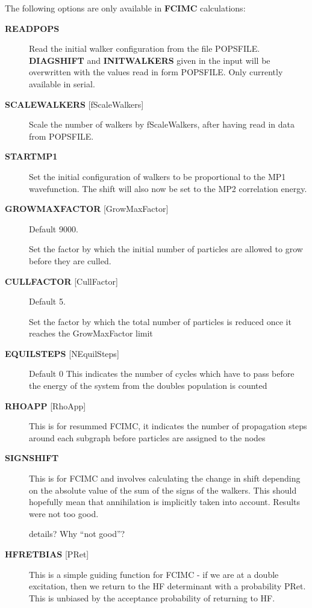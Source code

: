 \documentclass[openany,a4paper,10pt]{manual}
\begin{document}
The following options are only available in \textbf{FCIMC} calculations:
\begin{description}
\item[\textbf{READPOPS}]
Read the initial walker configuration from the file POPSFILE.
\textbf{DIAGSHIFT} and \textbf{INITWALKERS} given in the input will be
overwritten with the values read in form POPSFILE. Only currently available in serial.

\item[\textbf{SCALEWALKERS} {[}fScaleWalkers{]}]
Scale the number of walkers by fScaleWalkers, after having read in data from POPSFILE.

\item[\textbf{STARTMP1}]
Set the initial configuration of walkers to be proportional to the MP1 wavefunction. The shift will also
now be set to the MP2 correlation energy.

\item[\textbf{GROWMAXFACTOR} {[}GrowMaxFactor{]}]
Default 9000.

Set the factor by which the initial number of particles are allowed to grow before
they are culled.

\item[\textbf{CULLFACTOR} {[}CullFactor{]}]
Default 5.

Set the factor by which the total number of particles is reduced once it reaches the GrowMaxFactor limit

\item[\textbf{EQUILSTEPS} {[}NEquilSteps{]}]
Default 0
This indicates the number of cycles which have to
pass before the energy of the system from the doubles
population is counted

\item[\textbf{RHOAPP} {[}RhoApp{]}]
This is for resummed FCIMC, it indicates the number of propagation steps
around each subgraph before particles are assigned to the nodes

\item[\textbf{SIGNSHIFT}]
This is for FCIMC and involves calculating the change in shift depending on
the absolute value of the sum of the signs of the walkers.  This should
hopefully mean that annihilation is implicitly taken into account. Results
were not too good.

\begin{notice}[note]
details?  Why ``not good''?
\end{notice}

\item[\textbf{HFRETBIAS} {[}PRet{]}]
This is a simple guiding function for FCIMC - if we are at a double
excitation, then we return to the HF determinant with a probability PRet.
This is unbiased by the acceptance probability of returning to HF.


\end{description}
\end{document}
